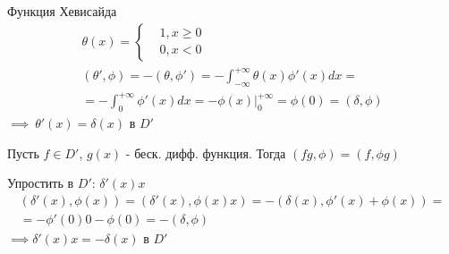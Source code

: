 \documentclass{article}
\begin{document}
\begin{eg}
  Функция Хевисайда
  \begin{gather*}
    \theta(x)= \left\{\begin{aligned}
      & 1, x \ge 0 \\ 
      & 0, x < 0
    \end{aligned}\right. \\ 
    (\theta',\phi)=-(\theta,\phi')=-\int_{-\infty}^{+\infty}\theta(x)\phi'(x)dx = \\ 
    = -\int_{0}^{+\infty}\phi'(x)dx=-\phi(x)\big|_{0}^{+\infty}=\phi(0)=(\delta,\phi)
  \end{gather*}
  $\implies \ \theta'(x)=\delta(x)$ в $D'$
\end{eg}
\begin{definition}
  Пусть $f \in D'$, $g(x)$ - беск. дифф. функция. Тогда $(fg, \phi)=(f,\phi g)$
\end{definition}
\begin{eg}
  Упростить в $D'$: $\delta'(x)x$
  \begin{gather*}
    (\delta'(x),\phi(x))=(\delta'(x),\phi(x)x)=-(\delta(x),\phi'(x)+\phi(x))= \\ 
    =-\phi'(0)0-\phi(0)=-(\delta,\phi)
  \end{gather*}
  $\implies \delta'(x)x=-\delta(x)$ в $D'$
\end{eg}
\end{document}
